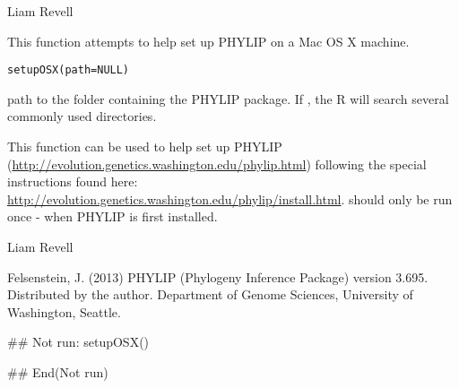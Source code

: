 \documentclass[a4paper]{book}
\begin{document}
%
\begin{Author}\relax
Liam Revell 
\end{Author}
%
\begin{Description}\relax
This function attempts to help set up PHYLIP on a Mac OS X machine.
\end{Description}
%
\begin{Usage}
\begin{verbatim}
setupOSX(path=NULL)
\end{verbatim}
\end{Usage}
%
\begin{Arguments}
\begin{ldescription}
\item[\code{path}] path to the folder containing the PHYLIP package. If , the R will search several commonly used directories.
\end{ldescription}
\end{Arguments}
%
\begin{Details}\relax
This function can be used to help set up PHYLIP (\url{http://evolution.genetics.washington.edu/phylip.html}) following the special instructions found here: \url{http://evolution.genetics.washington.edu/phylip/install.html}.  should only be run once - when PHYLIP is first installed.
\end{Details}
%
\begin{Author}\relax
Liam Revell 
\end{Author}
%
\begin{References}\relax
Felsenstein, J. (2013) PHYLIP (Phylogeny Inference Package) version 3.695. Distributed by the author. Department of Genome Sciences, University of Washington, Seattle.
\end{References}
%
\begin{Examples}
\begin{ExampleCode}
## Not run: 
setupOSX()

## End(Not run)
\end{ExampleCode}
\end{Examples}
\printindex{}
\end{document}
